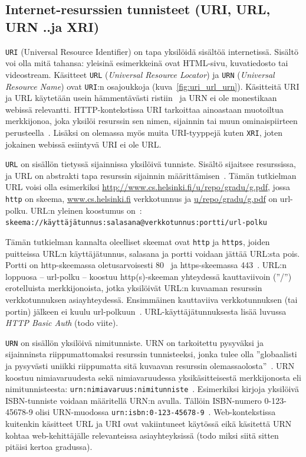 \documentclass[finnish,gradu]{tktltiki}
\begin{document}
  \subsection{Internet-resurssien tunnisteet (URI, URL, URN ..ja XRI)} %
  \label{sub:käsitteet_uri_url_ja_urn}

  \verb!URI! (Universal Resource Identifier) on tapa yksilöidä sisältöä internetissä. Sisältö voi olla mitä tahansa: yleisinä esimerkkeinä ovat HTML-sivu, kuvatiedosto tai videostream. Käsitteet \verb!URL! (\emph{Universal Resource Locator}) ja \verb!URN! (\emph{Universal Resource Name}) ovat \verb!URI!:n osajoukkoja (kuva~\ref{fig:uri_url_urn}). Käsitteitä URI ja URL käytetään usein hämmentävästi ristiin~\cite{w3c_uri_clarifications} ja URN ei ole monestikaan webissä relevantti. HTTP-kontekstissa URI tarkoittaa ainoastaan muotoiltua merkkijonoa, joka yksilöi resurssin sen nimen, sijainnin tai muun ominaispiirteen perusteella~\cite{ietf_rfc_http1.1}. Lisäksi on olemassa myös muita URI-tyyppejä kuten \verb!XRI!, joten jokainen webissä esiintyvä URI ei ole URL.

  \verb!URL! on sisällön tietyssä sijainnissa yksilöivä tunniste. Sisältö sijaitsee resurssissa, ja URL on abstrakti tapa resurssin sijainnin määrittämisen~\cite{ietf_rfc_urls}. Tämän tutkielman URL voisi olla esimerkiksi \url{http://www.cs.helsinki.fi/u/repo/gradu/g.pdf}, jossa \verb!http! on skeema, \url{www.cs.helsinki.fi} verkkotunnus ja \url{u/repo/gradu/g.pdf} on url-polku. URL:n yleinen koostumus on~\cite{ietf_rfc_urls}:
  \\ \verb!skeema://käyttäjätunnus:salasana@verkkotunnus:portti/url-polku!

  Tämän tutkielman kannalta oleelliset skeemat ovat \verb!http! ja \verb!https!, joiden puitteissa URL:n käyttäjätunnus, salasana ja portti voidaan jättää URL:sta pois. Portti on http-skeemassa oletusarvoisesti 80~\cite{ietf_rfc_urls} ja https-skeemassa 443~\cite{ietf_rfc_http_tls}. URL:n loppuosa -- url-polku -- koostuu http(s)-skeeman yhteydessä kauttaviivoin (''/'') erotelluista merkkijonoista, jotka yksilöivät URL:n kuvaaman resurssin verkkotunnuksen asiayhteydessä. Ensimmäinen kauttaviiva verkkotunnuksen (tai portin) jälkeen ei kuulu url-polkuun~\cite{ietf_rfc_urls}. URL-käyttäjätunnuksesta lisää luvussa \emph{HTTP Basic Auth} (todo viite).


  \verb!URN! on sisällön yksilöivä nimitunniste. URN on tarkoitettu pysyväksi ja sijainninsta riippumattomaksi resurssin tunnisteeksi, jonka tulee olla ''globaalisti ja pysyvästi uniikki riippumatta sitä kuvaavan resurssin olemassaolosta''~\cite{ietf_rfc_uri_syntax}. URN koostuu nimiavaruudesta sekä nimiavaruudessa yksikäsitteisestä merkkijonosta eli nimitunnisteesta: \verb!urn:nimiavaruus:nimitunniste!~\cite{ietf_rfc_urn_syntax}. Esimerkiksi kirjoja yksilöivä ISBN-tunniste voidaan määritellä URN:n avulla. Tällöin ISBN-numero 0-123-45678-9 olisi URN-muodossa \verb!urn:isbn:0-123-45678-9!~\cite{w3c_uri_clarifications}. Web-kontekstissa kuitenkin käsitteet URL ja URI ovat vakiintuneet käytössä eikä käsitettä URN kohtaa web-kehittäjälle relevanteissa asiayhteyksissä (todo miksi siitä sitten pitäisi kertoa gradussa).
\end{document}
